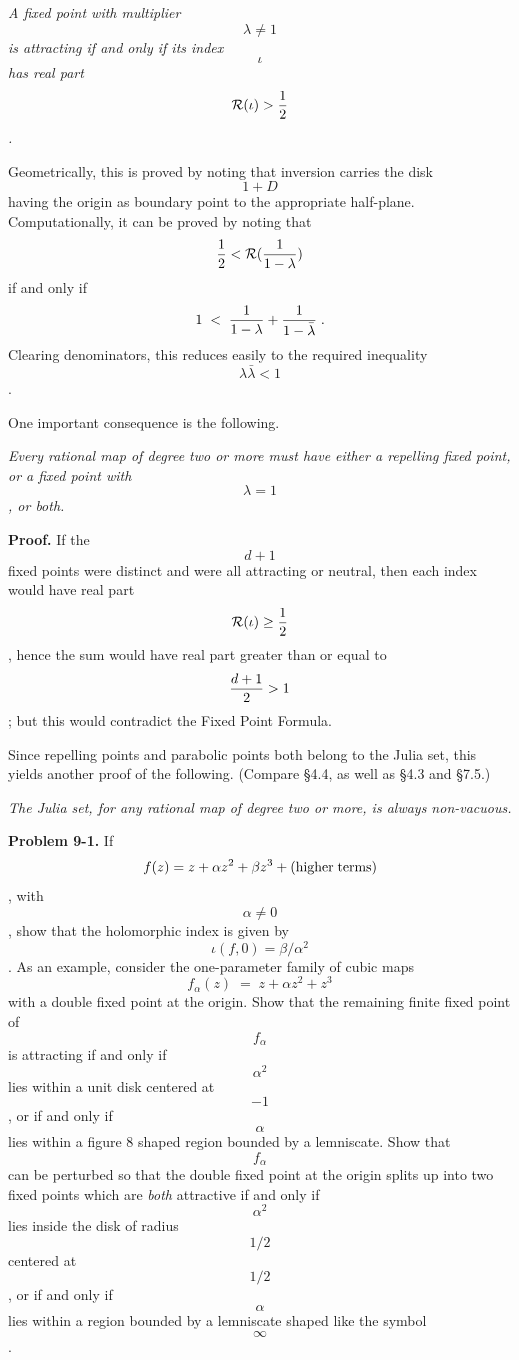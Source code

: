 { {\it A fixed point with multiplier \[\lambda\ne 1\]
is attracting if and only if its index \[\iota\]
has real part \[{\cal R}(\iota)>{1\over 2}\].}\bigskip}

Geometrically, this is proved by noting that inversion carries the disk
\[1+D\] having the origin as boundary point to the appropriate half-plane.
Computationally, it can be proved by noting that \[{1\over 2}<{\cal R}
({1\over 1-\lambda})\] if and only if
$$	1\;<\;{1\over 1-\lambda}+{1\over 1-\bar\lambda}\;.	$$
Clearing denominators, this reduces easily to the required inequality
\[\lambda\bar\lambda<1\].\QED

One important consequence is the following.\medskip

{ {\it Every rational map of degree two or more
must have either a repelling fixed point, or a fixed point
with \[\lambda= 1\], or both.}\bigskip}

{\bf Proof.} If the \[d+1\] fixed points were distinct and were all
attracting or neutral, then each index would have real part \[{\cal R}(\iota)
\ge{1\over 2}\], hence the sum would have real part greater than or equal to
\[{d+1\over 2}>1\]; but this would contradict the Fixed Point Formula.\QED

Since repelling points and parabolic points both belong to the Julia set,
this yields another proof of the following. (Compare \S4.4, as well as
\S4.3 and \S7.5.)

{ \it The Julia set, for any rational map of
degree two or more, is always non-vacuous.\smallskip}
\lln\medskip

{\bf Problem 9-1.} If \[\;f(z)=z+\alpha z^2+\beta z^3+({\rm higher\;terms})
\,\],
with \[\alpha\ne 0\], show that the holomorphic index is given by
\[\iota(f,0)=\beta/\alpha^2\]. As an example,
consider the one-parameter family of cubic maps
$$	f_\alpha(z)\;=\;z+\alpha z^2+z^3	$$
with a double fixed point at the origin. Show that the remaining finite
fixed point of \[f_\alpha\]
is attracting if and only if \[\alpha^2\] lies within a unit disk centered
at \[-1\], or if and only if \[\alpha\] lies within a figure 8 shaped region
bounded by a lemniscate. Show that \[f_\alpha\] can be perturbed so that the
double fixed point at the origin splits up into two fixed points which
are {\it both} attractive
if and only if \[\alpha^2\] lies inside the disk of radius \[1/2\] centered
at \[1/2\], or if and only if \[\alpha\] lies within a region bounded
by a lemniscate shaped like the symbol \[\infty\].\smallskip

